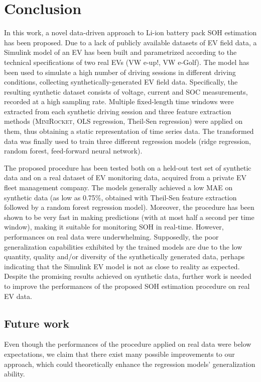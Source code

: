 \chapter{Conclusion}
\label{sec:conclusion}

In this work, a novel data-driven approach to Li-ion battery pack SOH estimation has been proposed. Due to a lack of publicly available datasets of EV field data, a Simulink model of an EV has been built and parametrized according to the technical specifications of two real EVs (VW e-up!, VW e-Golf). The model has been used to simulate a high number of driving sessions in different driving conditions, collecting synthetically-generated EV field data. Specifically, the resulting synthetic dataset consists of voltage, current and SOC measurements, recorded at a high sampling rate. Multiple fixed-length time windows were extracted from each synthetic driving session and three feature extraction methods (\textsc{MiniRocket}, OLS regression, Theil-Sen regression) were applied on them, thus obtaining a static representation of time series data. The transformed data was finally used to train three different regression models (ridge regression, random forest, feed-forward neural network).

The proposed procedure has been tested both on a held-out test set of synthetic data and on a real dataset of EV monitoring data, acquired from a private EV fleet management company. The models generally achieved a low MAE on synthetic data (as low as 0.75\%, obtained with Theil-Sen feature extraction followed by a random forest regression model). Moreover, the procedure has been shown to be very fast in making predictions (with at most half a second per time window), making it suitable for monitoring SOH in real-time. However, performances on real data were underwhelming. Supposedly, the poor generalization capabilities exhibited by the trained models are due to the low quantity, quality and/or diversity of the synthetically generated data, perhaps indicating that the Simulink EV model is not as close to reality as expected. Despite the promising results achieved on synthetic data, further work is needed to improve the performances of the proposed SOH estimation procedure on real EV data.

\section{Future work}
\label{sec:future_work}
Even though the performances of the procedure applied on real data were below expectations, we claim that there exist many possible improvements to our approach, which could theoretically enhance the regression models' generalization ability.

